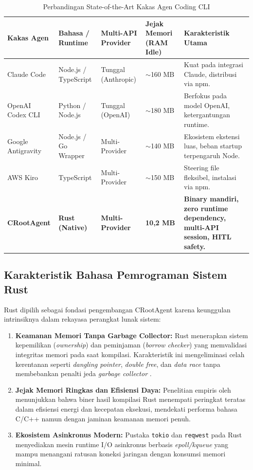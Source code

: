 \begin{table}[htbp]
\centering
\small
\caption{Perbandingan State-of-the-Art Kakas Agen Coding CLI}
\label{tab:sota}
\begin{tabularx}{\textwidth}{l p{2.8cm} p{2.2cm} p{2.2cm} X}
\toprule
\textbf{Kakas Agen} & \textbf{Bahasa / Runtime} & \textbf{Multi-API Provider} & \textbf{Jejak Memori (RAM Idle)} & \textbf{Karakteristik Utama} \\
\midrule
Claude Code & Node.js / TypeScript & Tunggal (Anthropic) & $\sim$160 MB & Kuat pada integrasi Claude, distribusi via npm. \\
OpenAI Codex CLI & Python / Node.js & Tunggal (OpenAI) & $\sim$180 MB & Berfokus pada model OpenAI, ketergantungan runtime. \\
Google Antigravity & Node.js / Go Wrapper & Multi-Provider & $\sim$140 MB & Ekosistem ekstensi luas, beban startup terpengaruh Node. \\
AWS Kiro & TypeScript & Multi-Provider & $\sim$150 MB & Steering file fleksibel, instalasi via npm. \\
\textbf{CRootAgent} & \textbf{Rust (Native)} & \textbf{Multi-Provider} & \textbf{10,2 MB} & \textbf{Binary mandiri, zero runtime dependency, multi-API session, HITL safety.} \\
\bottomrule
\end{tabularx}
\end{table}

\subsection{Karakteristik Bahasa Pemrograman Sistem Rust}
Rust dipilih sebagai fondasi pengembangan CRootAgent karena keunggulan intrinsiknya dalam rekayasa perangkat lunak sistem:
\begin{enumerate}
    \item \textbf{Keamanan Memori Tanpa Garbage Collector:} Rust menerapkan sistem kepemilikan (\textit{ownership}) dan peminjaman (\textit{borrow checker}) yang memvalidasi integritas memori pada saat kompilasi. Karakteristik ini mengeliminasi celah kerentanan seperti \textit{dangling pointer}, \textit{double free}, dan \textit{data race} tanpa membebankan penalti jeda \textit{garbage collector} \cite{levy2020rust}.
    \item \textbf{Jejak Memori Ringkas dan Efisiensi Daya:} Penelitian empiris oleh \cite{pereira2021energy} menunjukkan bahwa biner hasil kompilasi Rust menempati peringkat teratas dalam efisiensi energi dan kecepatan eksekusi, mendekati performa bahasa C/C++ namun dengan jaminan keamanan memori penuh.
    \item \textbf{Ekosistem Asinkronus Modern:} Pustaka \texttt{tokio} dan \texttt{reqwest} pada Rust menyediakan mesin runtime I/O asinkronus berbasis \textit{epoll/kqueue} yang mampu menangani ratusan koneksi jaringan dengan konsumsi memori minimal.
\end{enumerate}


